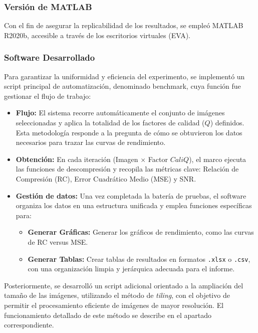 \documentclass[a4paper, 12pt]{article}
\begin{document}
\subsubsection{Versión de MATLAB}
Con el fin de asegurar la replicabilidad de los resultados, se empleó MATLAB R2020b, accesible a través de los escritorios virtuales (EVA).
\subsubsection{Software Desarrollado}
Para garantizar la uniformidad y eficiencia del experimento, se implementó un script principal de automatización, denominado benchmark, cuya función fue gestionar el flujo de trabajo:

\begin{itemize}
    \item \textbf{Flujo:} El sistema recorre automáticamente el conjunto de imágenes seleccionadas y aplica la totalidad de los factores de calidad ($Q$) definidos. Esta metodología responde a la pregunta de cómo se obtuvieron los datos necesarios para trazar las curvas de rendimiento.
    
    \item \textbf{Obtención:} En cada iteración (Imagen $\times$ Factor $CaliQ$), el marco ejecuta las funciones de descompresión y recopila las métricas clave: Relación de Compresión (RC), Error Cuadrático Medio (MSE) y SNR.
    
    \item \textbf{Gestión de datos:} Una vez completada la batería de pruebas, el software organiza los datos en una estructura unificada y emplea funciones específicas para:
    \begin{itemize}
        \item \textbf{Generar Gráficas:} Generar los gráficos de rendimiento, como las curvas de RC versus MSE.
        \item \textbf{Generar Tablas:} Crear tablas de resultados en formatos \texttt{.xlsx} o \texttt{.csv}, con una organización limpia y jerárquica adecuada para el informe.
    \end{itemize}
\end{itemize}

Posteriormente, se desarrolló un script adicional orientado a la ampliación del tamaño de las imágenes, utilizando el método de \textit{tiling}, con el objetivo de permitir el procesamiento eficiente de imágenes de mayor resolución. El funcionamiento detallado de este método se describe en el apartado correspondiente.
\end{document}

